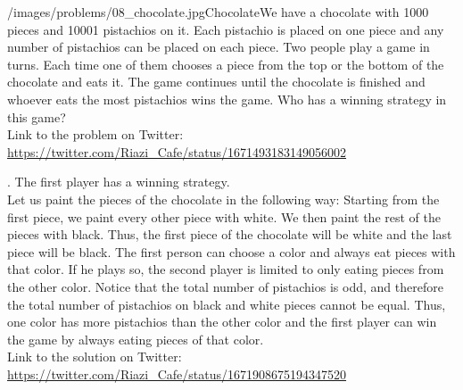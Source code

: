 \begin{problem}{/images/problems/08_chocolate.jpg}{Chocolate}We have a chocolate with 1000 pieces and 10001 pistachios on it. Each pistachio is placed on one piece and any number of pistachios can be placed on each piece. Two people play a game in turns. Each time one of them chooses a piece from the top or the bottom of the chocolate and eats it. The game continues until the chocolate is finished and whoever eats the most pistachios wins the game. Who has a winning strategy in this game?\\[0.2cm]

Link to the problem on Twitter:  \url{https://twitter.com/Riazi_Cafe/status/1671493183149056002}\end{problem}
\begin{solution}.
The first player has a winning strategy. \\[0.2cm]
Let us paint the pieces of the chocolate in the following way: Starting from the first piece, we paint every other piece with white. We then paint the rest of the pieces with black. Thus, the first piece of the chocolate will be white and the last piece will be black. The first person can choose a color and always eat pieces with that color. If he plays so, the second player is limited to only eating pieces from the other color.  Notice that the total number of pistachios is odd, and therefore the total number of pistachios on black and white pieces cannot be equal. Thus, one color has more pistachios than the other color and the first player can win the game by always eating pieces of that color.\\[0.2cm]

Link to the solution on Twitter:  \url{https://twitter.com/Riazi_Cafe/status/1671908675194347520}\end{solution}
